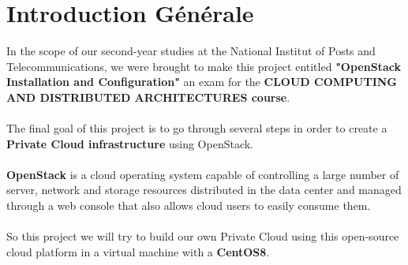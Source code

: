 \chapter*{Introduction Générale}
\begin{spacing}{1.5}
\Large In the scope of our second-year studies at the National Institut of Posts and Telecommunications, we were brought to make this project entitled \textbf{"OpenStack Installation and Configuration"} an exam for the \textbf{CLOUD COMPUTING AND DISTRIBUTED ARCHITECTURES course}.
\\\\
The final goal of this project is to go through several steps in order to create a \textbf{Private Cloud infrastructure} using OpenStack.
\\\\
\textbf{OpenStack} is a cloud operating system capable of controlling a large number of server, network and storage resources distributed in the data center and managed through a web console that also allows cloud users to easily consume them. 
\\\\
So this project we will try to build our own Private Cloud using this open-source cloud platform in a virtual machine with a \textbf{CentOS8}. \\ 


\end{spacing}

\makeatletter
\renewcommand{\thesection}{\@arabic\c@section}
\makeatother
